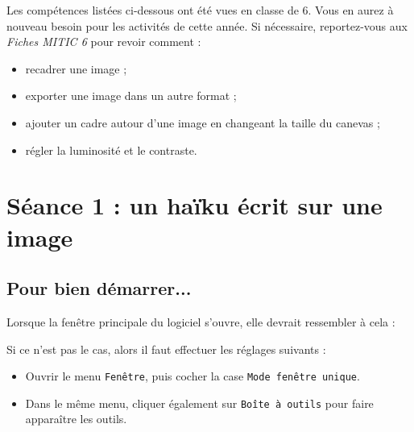 \vspace{12pt}

Les compétences listées ci-dessous ont été vues en classe de 6. Vous en aurez à nouveau besoin pour les activités de cette année. Si nécessaire, reportez-vous aux \emph{Fiches MITIC 6} pour revoir comment :  

\begin{itemize}
\item recadrer une image ;
\item exporter une image dans un autre format ;
\item ajouter un cadre autour d'une image en changeant la taille du canevas ;
\item régler la luminosité et le contraste.
\end{itemize}









\newpage

%
%
%
%


\section{Séance 1 : un haïku écrit sur une image}\label{ficheImage5e1}


\subsection{Pour bien démarrer...}

Lorsque la fenêtre principale du logiciel s'ouvre, elle devrait ressembler à cela :


Si ce n'est pas le cas, alors il faut effectuer les réglages suivants :

\begin{minipage}[c]{.58\textwidth}
\begin{itemize}
\item Ouvrir le menu \texttt{Fenêtre}, puis cocher la case \texttt{Mode fenêtre unique}.
\item Dans le même menu, cliquer également sur \texttt{Boîte à outils} pour faire apparaître les outils.
\end{itemize}
\end{minipage}\hfill%
\begin{minipage}[c]{.38\textwidth}
\end{minipage}

